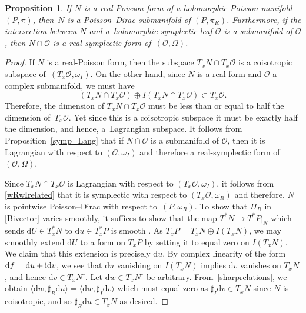 \documentclass[pdftex]{sigma}
\numberwithin{equation}{section}
\newtheorem{Proposition}[Theorem]{Proposition}
 { \theoremstyle{definition}
\newtheorem{Definition}[Theorem]{Definition}
\newtheorem{Note}[Theorem]{Note}
\newtheorem{Example}[Theorem]{Example}
\newtheorem{Remark}[Theorem]{Remark} }
\newcommand{\orb}{\mathcal{O}}
\begin{document}
\begin{Proposition}If $N$ is a real-Poisson form of a holomorphic Poisson manifold $(P,\pi)$, then~$N$ is a Poisson--Dirac submanifold of $(P,\pi_R)$. Furthermore, if the intersection between $N$ and a~holomorphic symplectic leaf $\orb$ is a submanifold of $\orb$, then $N\cap\orb$ is a real-symplectic form of~$(\orb,\Omega)$.
\end{Proposition}
\begin{proof}
If $N$ is a real-Poisson form, then the subspace $T_xN\cap T_x\orb$ is a coisotropic subspace of~$(T_x\orb,\omega_I)$. On the other hand, since $N$ is a real form and $\orb$ a complex submanifold, we must have
	\[
	(T_xN\cap T_x\orb)\oplus I(T_xN\cap T_x\orb)\subset T_x\orb.
	\]
	Therefore, the dimension of $T_xN\cap T_x\orb$ must be less than or equal to half the dimension of~$T_x\orb$. Yet since this is a coisotropic subspace it must be exactly half the dimension, and hence, a~Lagrangian subspace. It follows from Proposition~\ref{symp_Lang} that if $N\cap\orb$ is a submanifold of $\orb$, then it is Lagrangian with respect to $(\orb,\omega_I)$ and therefore a real-symplectic form of $(\orb,\Omega)$.
	
	Since $T_xN\cap T_x\orb$ is Lagrangian with respect to $(T_x\orb,\omega_I)$, it follows from \eqref{wRwIrelated} that it is symplectic with respect to $(T_x\orb,\omega_R)$ and therefore, $N$ is pointwise Poisson--Dirac with respect to~$(P,\omega_R)$. To show that $\Pi_R$ in \eqref{Bivector} varies smoothly, it suffices to show that the map $T^*N\rightarrow T^*P|_N$ which sends $\mathrm{d}U\in T_x^*N$ to $\mathrm{d}u\in T_x^*P$ is smooth \cite{crainic}. As $T_xP=T_xN\oplus I(T_xN)$, we may smoothly extend $\mathrm{d}U$ to a form on $T_xP$ by setting it to equal zero on $I(T_xN)$. We claim that this extension is precisely $\mathrm{d}u$. By complex linearity of the form $\mathrm{d}f=\mathrm{d}u+{\rm i}\mathrm{d}v$, we see that $\mathrm{d}u$ vanishing on $I(T_xN)$ implies $\mathrm{d}v$ vanishes on $T_xN$, and hence $\mathrm{d}v\in T_xN^\circ$. Let $\mathrm{d}w\in T_xN^\circ$ be arbitrary. From~\eqref{sharprelations}, we obtain $\langle \mathrm{d}w, \sharp_R \mathrm{d}u\rangle=\langle \mathrm{d}w, \sharp_I \mathrm{d}v\rangle$ which must equal zero as $\sharp_I \mathrm{d}v\in T_xN$ since $N$ is coisotropic, and so $\sharp_R \mathrm{d}u\in T_xN$ as desired.
\end{proof}
\end{document}
